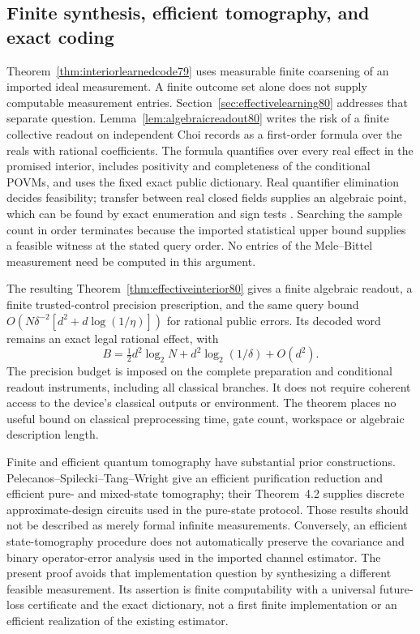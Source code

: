 \subsection{Finite synthesis, efficient tomography, and exact coding}
Theorem~\ref{thm:interiorlearnedcode79} uses measurable finite
coarsening of an imported ideal measurement. A finite outcome set
alone does not supply computable measurement entries.
Section~\ref{sec:effectivelearning80} addresses that separate
question. Lemma~\ref{lem:algebraicreadout80} writes the risk of a
finite collective readout on independent Choi records as a
first-order formula over the reals with rational coefficients.
The formula quantifies over every real effect in the promised
interior, includes positivity and completeness of the conditional
POVMs, and uses the fixed exact public dictionary.
Real quantifier elimination decides feasibility; transfer between
real closed fields supplies an algebraic point, which can be found
by exact enumeration and sign tests
\cite[Theorems~2.77 and~2.80 and Chapter~14]{BPR80}.
Searching the sample count in order terminates because the imported
statistical upper bound supplies a feasible witness at the stated
query order. No entries of the Mele--Bittel measurement need be
computed in this argument.

The resulting Theorem~\ref{thm:effectiveinterior80} gives a finite
algebraic readout, a finite trusted-control precision prescription,
and the same query bound
$O(N\delta^{-2}[d^2+d\log(1/\eta)])$ for rational public errors.
Its decoded word remains an exact legal rational effect, with
\[
 B=\tfrac12d^2\log_2N+d^2\log_2(1/\delta)+O(d^2).
\]
The precision budget is imposed on the complete preparation and
conditional readout instruments, including all classical branches.
It does not require coherent access to the device's classical
outputs or environment. The theorem places no useful bound on
classical preprocessing time, gate count, workspace or algebraic
description length.

Finite and efficient quantum tomography have substantial prior
constructions. Pelecanos--Spilecki--Tang--Wright
\cite[Theorems~1.1--1.3, Section~3.3 and Figures~8--9]{PSTW80}
give an efficient purification reduction and efficient pure- and
mixed-state tomography; their Theorem~4.2 supplies discrete
approximate-design circuits used in the pure-state protocol.
Those results should not be described as merely formal infinite
measurements. Conversely, an efficient state-tomography procedure
does not automatically preserve the covariance and binary
operator-error analysis used in the imported channel estimator.
The present proof avoids that implementation question by
synthesizing a different feasible measurement. Its assertion is
finite computability with a universal future-loss certificate and
the exact dictionary, not a first finite implementation or an
efficient realization of the existing estimator.

